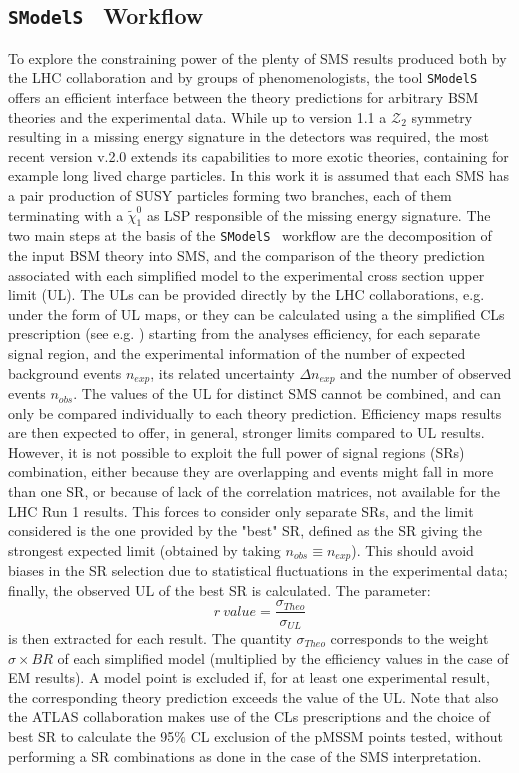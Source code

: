 \documentclass[a4paper,11pt]{article}
\newcommand{\SMO}{\texttt{SModelS\xspace}}
\begin{document}
\subsection{\SMO~ Workflow}\label{smo}
To explore the constraining power of the plenty of SMS results produced both by the LHC collaboration and by groups of phenomenologists, the tool \SMO\cite{Kraml:2013mwa,Ambrogi:2017neo,Ambrogi:2018ujg} offers an efficient interface between the theory predictions for arbitrary BSM theories and the experimental data. While up to version 1.1 a $\mathcal{Z}_2$ symmetry resulting in a missing energy signature in the detectors was required, the most recent version v.2.0 extends its capabilities to more exotic theories, containing for example long lived charge particles. In this work it is assumed that each SMS has a pair production of SUSY particles forming two branches, each of them terminating with a $ \tilde \chi_1 ^0$ as LSP responsible of the missing energy signature.
%
The two main steps at the basis of the \SMO~ workflow are the decomposition of the input BSM theory into SMS, and the comparison of the theory prediction associated with each simplified model to the experimental cross section upper limit (UL). The ULs can be provided directly by the LHC collaborations, e.g. under the form of UL maps, or they can be calculated using a the simplified CLs prescription (see e.g. \cite{Read:2002hq,Junk:1999kv}) starting from the analyses efficiency, for each separate signal region, and the experimental information of the number of expected background events $n_{exp}$, its related uncertainty $\Delta n_{exp}$ and the number of observed events $n_{obs}$. The values of the UL for distinct SMS cannot be combined, and can only be compared individually to each theory prediction. Efficiency maps results are then expected to offer, in general, stronger limits compared to UL results. However, it is not possible to exploit the full power of signal regions (SRs) combination, either because they are overlapping and events might fall in more than one SR, or because of lack of the correlation matrices, not available for the LHC Run 1 results. This forces to consider only separate SRs, and the limit considered is the one provided by the "best" SR, defined as the SR giving the strongest expected limit (obtained by taking $n_{obs}\equiv n_{exp}$). This should avoid biases in the SR selection due to statistical fluctuations in the experimental data; finally, the observed UL of the best SR is calculated. The parameter:
\begin{equation}\label{rvalue}
r \ value = \frac{\sigma_{Theo}}{\sigma_{UL}}
\end{equation}
is then extracted for each result. 
The quantity $\sigma_{Theo}$ corresponds to the weight $\sigma \times BR$ of each simplified model (multiplied by the efficiency values in the case of EM results). A model point is excluded if, for at least one experimental result, the corresponding theory prediction exceeds the value of the UL. Note that also the ATLAS collaboration makes use of the CLs prescriptions and the choice of best SR to calculate the 95$\%$ CL exclusion of the pMSSM points tested, without performing a SR combinations as done in the case of the SMS interpretation. 
\end{document}
